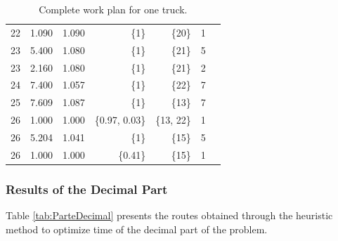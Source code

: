 \documentclass{amsart}
\begin{document}
\begin{table}[!htp]
\begin{tabular}{lrrrrrr}
            22 &1.090 &1.090 &\{1\} &\{20\} &1 \\
            23 &5.400 &1.080 &\{1\} &\{21\} &5 \\ 
            23 &2.160 &1.080 &\{1\} &\{21\} &2 \\
            24 &7.400 &1.057 &\{1\} &\{22\} &7 \\
            25 &7.609 &1.087 &\{1\} &\{13\} &7 \\
            26 &1.000 &1.000 &\{0.97, 0.03\} &\{13, 22\} &1 \\
            26 &5.204 &1.041 &\{1\} &\{15\} &5 \\
            26 &1.000 &1.000 &\{0.41\} &\{15\} &1 \\
            \bottomrule
            \end{tabular}
            \vspace{10pt}
            \caption{Complete work plan for one truck.}\label{tab:DistribucionViajes}
        \end{table}
        
        \subsubsection{Results of the Decimal Part}
        Table \ref{tab:ParteDecimal} presents the routes obtained through the heuristic method to optimize time of the decimal part of the problem.
        
\end{document}
